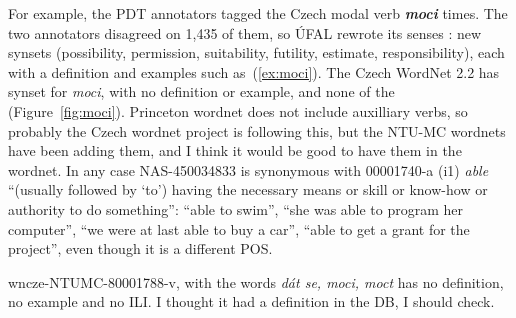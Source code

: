 \documentclass[a4paper,12pt]{article}
\newcommand{\fixme}[1]{\begin{fixmebox}\small #1\end{fixmebox}}
\begin{document}
For example, the PDT annotators tagged the Czech modal verb \textbf{\textit{moci}} 
times.  The two annotators disagreed on 1,435 of them, so ÚFAL rewrote
its senses \citep{bejcek-etal2006}:  new synsets
(possibility, permission, suitability, futility, estimate,
responsibility), each with a definition and examples such
as~(\ref{ex:moci}).  The Czech WordNet 2.2 has
 synset for \textit{moci}, with no definition or
example, and none of the  (Figure~\ref{fig:moci}).  Princeton wordnet does not include auxilliary verbs, so probably the Czech wordnet project is following this, but the NTU-MC wordnets have been adding them, and I think it would be good to have them in the wordnet.  In any case NAS-450034833 is synonymous with 00001740-a (i1) \textit{able} ``(usually followed by `to') having the necessary means or skill or know-how or authority to do something'': “able to swim”, “she was able to program her computer”, “we were at last able to buy a car”, “able to get a grant for the project”, even though it is a different POS.

\fixme{wncze-NTUMC-80001788-v, with the words \textit{dát se, moci, moct} has no definition, no example and no ILI.  I thought it had a definition in the DB, I should check.}
\end{document}
